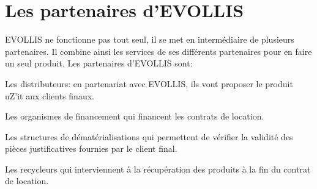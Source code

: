 \section{Les partenaires d'\textsf{EVOLLIS}}
\textsf{EVOLLIS} ne fonctionne pas tout seul, il se met en intermédiaire de plusieurs 
partenaires. Il combine ainsi les services de ses différents partenaires pour en faire 
un seul produit. Les partenaires d'\textsf{EVOLLIS} sont:
\begin{dinglist}{70}
\item Les distributeurs: en partenariat avec \textsf{EVOLLIS}, ils vont proposer le
produit \textsf{uZ'it} aux clients finaux.
\item Les organismes de financement qui financent les contrats de location.
\item Les structures de dématérialisations qui permettent de vérifier la validité des pièces 
justificatives fournies par le client final.
\item Les recycleurs qui interviennent à la récupération des produits à la fin du contrat
de location. 
\end{dinglist}

 
